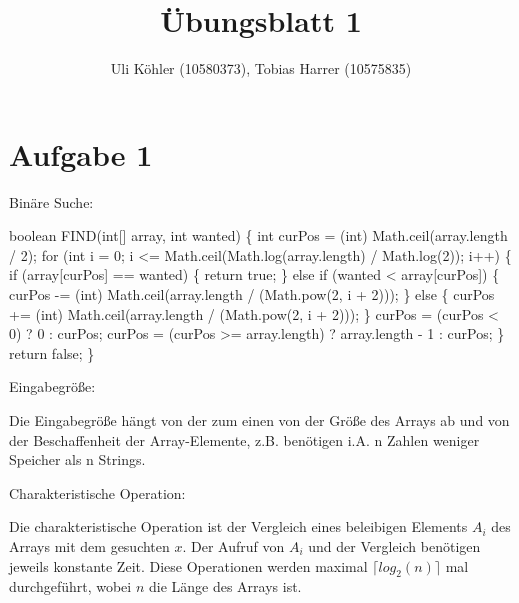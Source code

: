 \documentclass[a4paper,10pt,freqn]{article}
\title{Übungsblatt 1}
\author{Uli Köhler (10580373), Tobias Harrer (10575835)}
\begin{document}
\maketitle

\section*{Aufgabe 1}
Binäre Suche:\newline

boolean FIND(int[] array, int wanted) \{\newline
        int curPos = (int) Math.ceil(array.length / 2);\newline
        for (int i = 0; i <= Math.ceil(Math.log(array.length) / Math.log(2)); i++) \{\newline
            if (array[curPos] == wanted) \{\newline
                return true;\newline
            \} else if (wanted < array[curPos]) \{\newline
                curPos -= (int) Math.ceil(array.length / (Math.pow(2, i + 2)));\newline
            \} else \{\newline
                curPos += (int) Math.ceil(array.length / (Math.pow(2, i + 2)));\newline
            \}\newline
            curPos = (curPos < 0) ? 0 : curPos;\newline
            curPos = (curPos >= array.length) ? array.length - 1 : curPos;\newline
        \}\newline
        return false;\newline
    	\}\newline
    	
\begin{bfseries}Eingabegröße:\end{bfseries}\newline
Die Eingabegröße hängt von  der zum einen von der Größe des Arrays ab und von der
Beschaffenheit der Array-Elemente, z.B. benötigen i.A. n Zahlen weniger Speicher
als n Strings.

\begin{bfseries}Charakteristische Operation:\end{bfseries}\newline
Die charakteristische Operation ist der Vergleich eines beleibigen Elements $A_i$ des Arrays mit dem gesuchten $x$.
Der Aufruf von $A_i$ und der Vergleich benötigen jeweils konstante Zeit. Diese Operationen werden maximal
$\lceil log_{2}(n)\rceil$ mal durchgeführt, wobei $n$ die Länge des Arrays ist.
\end{document}
